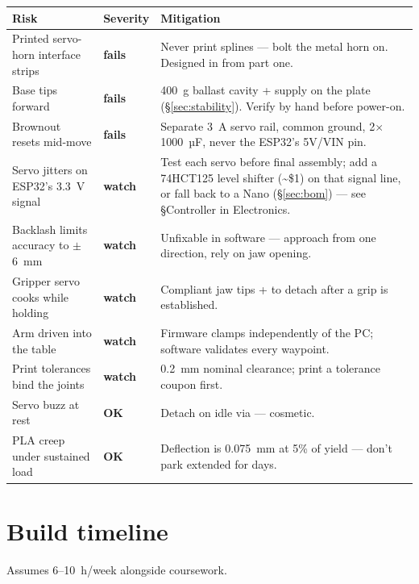 \documentclass[11pt]{article}
\newcommand{\code}[1]{\texttt{\detokenize{#1}}}
\newcommand{\micro}{\ifmmode\text{µ}\else µ\fi}
\newcommand{\okmark}{\textcolor{armok}{\textbf{OK}}}
\newcommand{\warnmark}{\textcolor{armwarn}{\textbf{watch}}}
\newcommand{\badmark}{\textcolor{armbad}{\textbf{fails}}}
\begin{document}
\begin{center}
\small
\begin{tabular}{@{}p{4.6cm}lp{7.6cm}@{}}
\toprule
\textbf{Risk} & \textbf{Severity} & \textbf{Mitigation} \\
\midrule
Printed servo-horn interface strips & \badmark & Never print splines --- bolt the metal horn on. Designed in from part one. \\
Base tips forward & \badmark & 400~g ballast cavity + supply on the plate (\S\ref{sec:stability}). Verify by hand before power-on. \\
Brownout resets mid-move & \badmark & Separate 3~A servo rail, common ground, 2$\times$1000~\micro F, never the ESP32's 5V/VIN pin. \\
Servo jitters on ESP32's 3.3~V signal & \warnmark & Test each servo before final assembly; add a 74HCT125 level shifter (\textasciitilde\$1) on that signal line, or fall back to a Nano (\S\ref{sec:bom}) --- see \S Controller in Electronics. \\
Backlash limits accuracy to \(\pm\)6~mm & \warnmark & Unfixable in software --- approach from one direction, rely on jaw opening. \\
Gripper servo cooks while holding & \warnmark & Compliant jaw tips + \code{REL} to detach after a grip is established. \\
Arm driven into the table & \warnmark & Firmware clamps independently of the PC; software validates every waypoint. \\
Print tolerances bind the joints & \warnmark & 0.2~mm nominal clearance; print a tolerance coupon first. \\
Servo buzz at rest & \okmark & Detach on idle via \code{REL} --- cosmetic. \\
PLA creep under sustained load & \okmark & Deflection is 0.075~mm at 5\% of yield --- don't park extended for days. \\
\bottomrule
\end{tabular}
\end{center}

\section{Build timeline}

Assumes 6--10~h/week alongside coursework.
\end{document}
